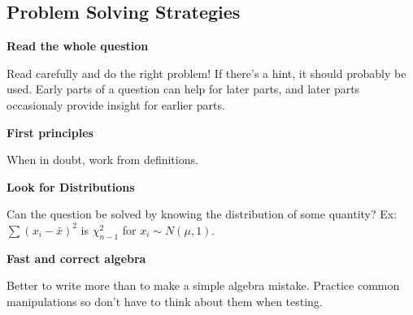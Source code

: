 \documentclass[10pt, twocolumn]{article}
\begin{document}
\subsection*{Problem Solving Strategies}

\textbf{Read the whole question}

Read carefully and do the right problem! If there's a hint, it should
probably be used. Early parts of a question can help for later parts, and later
parts occasionaly provide insight for earlier parts.

\textbf{First principles}

When in doubt, work from definitions.

\textbf{Look for Distributions} 

Can the question be solved by knowing the distribution of some
quantity?  Ex: $\sum (x_i - \bar{x})^2$ is $\chi^2_{n-1}$ for
$x_i \sim N(\mu, 1)$.

\textbf{Fast and correct algebra}

Better to write more than to make a simple algebra mistake.
Practice common manipulations so don't have to think about them
when testing.
\end{document}
